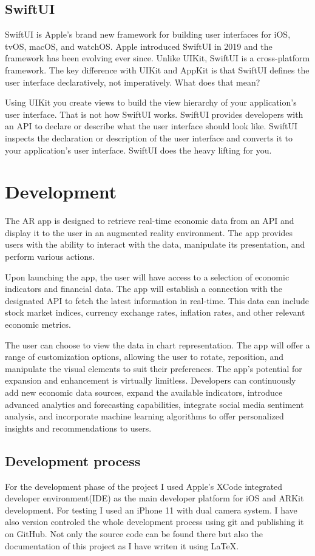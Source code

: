 \documentclass[a4paper,oneside]{article}
\begin{document}
\subsection{SwiftUI}

SwiftUI is Apple's brand new framework for building user interfaces for iOS, tvOS, macOS, and watchOS. Apple introduced SwiftUI in 2019 and the framework has been evolving ever since. Unlike UIKit, SwiftUI is a cross-platform framework. The key difference with UIKit and AppKit is that SwiftUI defines the user interface declaratively, not imperatively. What does that mean?

Using UIKit you create views to build the view hierarchy of your application's user interface. That is not how SwiftUI works. SwiftUI provides developers with an API to declare or describe what the user interface should look like. SwiftUI inspects the declaration or description of the user interface and converts it to your application's user interface. SwiftUI does the heavy lifting for you.


\newpage
\section{Development}

The AR app is designed to retrieve real-time economic data from an API and display it to the user in an augmented reality environment. The app provides users with the ability to interact with the data, manipulate its presentation, and perform various actions.

Upon launching the app, the user will have access to a selection of economic indicators and financial data. The app will establish a connection with the designated API to fetch the latest information in real-time.
This data can include stock market indices, currency exchange rates, inflation rates, and other relevant economic metrics.

The user can choose to view the data in chart representation.
The app will offer a range of customization options, allowing the user to rotate, reposition, and manipulate the visual elements to suit their preferences.
The app's potential for expansion and enhancement is virtually limitless. Developers can continuously add new economic data sources, expand the available indicators, introduce advanced analytics and forecasting capabilities, integrate social media sentiment analysis, and incorporate machine learning algorithms to offer personalized insights and recommendations to users.
\subsection{Development process}
For the development phase of the project I used Apple's XCode integrated developer environment(IDE) as the main developer platform for iOS and ARKit development. For testing I used an iPhone 11 with dual camera system.
I have also version controled the whole development process using git and publishing it on GitHub. Not only the source code can be found there but also the documentation of this project as I have writen it using \LaTeX{}.
\end{document}

